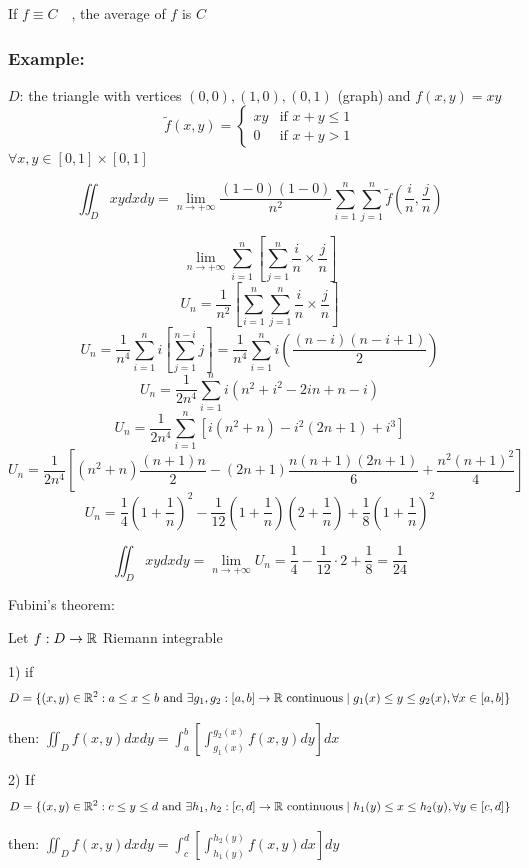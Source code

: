If  $f \equiv C \quad$, the average of $f$ is $C$

\subsubsection{Example:}

$D$: the triangle with vertices $(0,0),(1,0),(0,1)$
(graph) 
and $f(x,y) = xy $
\[
  \tilde{f}(x,y) = 
  \begin{cases}
    xy  & \text{if } x+y \le 1 \\
    0 & \text{if } x+y > 1
  \end{cases}
\]
$\forall x,y \in \left[0,1\right] \times \left[0,1\right]$

\[\iint_D xy dxdy = \lim\limits_{n \to +\infty} \frac{(1-0)(1-0)}{n^2} \sum_{i=1}^n\sum_{j= 1}^n\tilde{f}(\frac{i}{n},\frac{j}{n})\]

\[\lim\limits_{n \to +\infty}\sum_{i =1}^n \left[\sum_{j =1}^n \frac{i}{n}\times\frac{j}{n}\right]\]
\[U_n = \frac{1}{n^2}\left[\sum_{i=1}^n\sum_{j =1}^n \frac{i}{n}\times\frac{j}{n}\right]\]
\[U_n = \frac{1}{n^4} \sum_{i = 1}^n i\left[\sum_{j=1}^{n-i}j\right] = \frac{1}{n^4}\sum_{i =1}^n i\left(\frac{(n-i)(n-i+1)}{2}\right) \]
\[U_n =  \frac{1}{2n^4} \sum_{i=1}^n i (n^2 + i^2 - 2in + n-i) \]
\[U_n =  \frac{1}{2n^4} \sum_{i = 1}^n \left[i(n^2+n) - i^2(2n+1) +i^3\right]\]
\[U_n = \frac{1}{2n^4} \left[(n^2 + n)\frac{(n+1)n}{2} -(2n + 1)\frac{n(n+1)(2n +1)}{6} + \frac{n^2(n+1)^2}{4}\right] \]
\[U_n  = \frac{1}{4}(1 + \frac{1}{n})^2 - \frac{1}{12}(1 + \frac{1}{n})(2 + \frac{1}{n}) + \frac{1}{8}(1 + \frac{1}{n})^2\]

\[\iint_D xy dxdy = \lim\limits_{n \to + \infty} U_n = \frac{1}{4} - \frac{1}{12}\cdot 2  + \frac{1}{8} = \frac{1}{24}\]

\begin{theorem}
  Fubini's theorem:

  Let $f: D \to \mathbb{R}$ Riemann integrable

  1) if 
  \[D  = \{(x,y) \in \mathbb{R}^2 : a \le x\le b \text{ and } \exists g_1,g_2: \left[a,b\right] \to \mathbb{R} \text{ continuous}
    \mid 
    g_1(x) \le y \le g_2(x), \forall x \in \left[a,b\right]\}
  \]

  then: $\iint_D f(x,y)dxdy = \int_a^b \left[\int_{g_1(x)}^{g_2(x)}f(x,y)dy\right]dx$

  2) If
  \[
    D = \{ (x,y) \in \mathbb{R}^2 : c \le y \le d \text{ and } \exists h_1,h_2: \left[c,d\right] \to \mathbb{R} \text{ continuous}
    \mid h_1(y) \le x \le h_2(y), \forall y \in \left[c,d\right] \}
  \]

  then: $\iint_D f(x,y)dxdy = \int_c^d \left[\int_{h_1(y)}^{h_2(y)}f(x,y)dx\right]dy$
\end{theorem}

